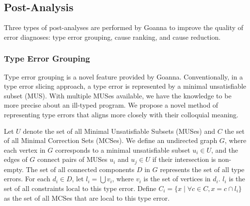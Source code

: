 


	\subsection{Post-Analysis}
	Three types of post-analyses are performed by Goanna to improve the quality of error diagnoses: type error grouping, cause ranking, and cause reduction. 
    \subsubsection{Type Error Grouping} \label{sub:grouping}

    Type error grouping is a novel feature provided by Goanna. Conventionally, in a type error slicing approach, a type error is represented by a minimal unsatisfiable subset (MUS). With multiple MUSes available, we have the knowledge to be more precise about an ill-typed program. We propose a novel method of representing type errors that aligns more closely with their colloquial meaning.

	Let $U$ denote the set of all Minimal Unsatisfiable Subsets (MUSes) and $C$ the set of all Minimal Correction Sets (MCSes). We define an undirected graph $G$, where each vertex in $G$ corresponds to a minimal unsatisfiable subset $u_i \in U$, and the edges of $G$ connect pairs of MUSes $u_i$ and $u_j \in U$ if their intersection is non-empty. The set of all connected components $D$ in $G$ represents the set of all type errors. For each $d_i \in D$, let $l_i = \bigcup v_i$, where $v_i$ is the set of vertices in $d_i$. $l_i$ is the set of all constraints local to this type error. Define $C_i = \{ x \mid \forall c \in C, x = c \cap l_i \}$ as the set of all MCSes that are local to this type error.


